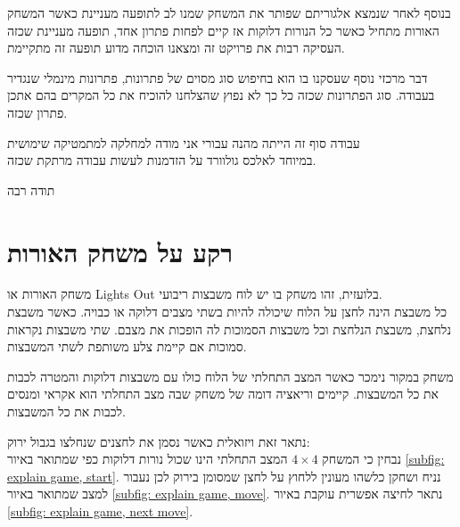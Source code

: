 \documentclass[12pt,twoside]{article}
\begin{document}
בנוסף 
לאחר שנמצא אלגוריתם שפותר את המשחק שמנו לב לתופעה מעניינת  כאשר המשחק האורות
מתחיל כאשר כל הנורות דלוקות אז קיים לפחות פתרון אחד,
תופעה מעניינת שכזה העסיקה רבות את פרויקט זה ומצאנו הוכחה מדוע תופעה זה מתקיימת.

דבר מרכזי נוסף שעסקנו בו הוא בחיפוש סוג מסוים של פתרונות, פתרונות מינמלי שנגדיר בעבודה. 
סוג הפתרונות שכזה כל כך לא נפוץ שהצלחנו להוכיח את כל המקרים 
בהם אתכן פתרון שכזה.

עבודה סוף זה הייתה מהנה עבורי אני מודה למחלקה
למתמטיקה שימושית
\\
במיוחד לאלכס גולוורד על הזדמנות לעשות 
עבודה מרתקת שכזה.

תודה רבה

\newpage

\section{רקע על משחק האורות}
משחק האורות או 
\textenglish{Lights Out}
בלועזית,
זהו משחק בו יש לוח משבצות ריבועי.
\\
כל משבצת הינה לחצן על הלוח שיכולה להיות בשתי מצבים
דלוקה או כבויה.
כאשר משבצת נלחצת, משבצת הנלחצת וכל משבצות הסמוכות לה הופכות את מצבם.
שתי משבצות נקראות סמוכות אם קיימת צלע משותפת לשתי המשבצות.

משחק במקור נימכר כאשר המצב התחלתי של הלוח כולו עם משבצות דלוקות והמטרה לכבות את כל המשבצות.
קיימים וריאציה דומה של משחק שבה מצב התחלתי הוא אקראי ומנסים לכבות את כל המשבצות.

נתאר זאת ויזואלית כאשר
נסמן את לחצנים שנחלצו בגבול ירוק:
\\
נבחין כי המשחק 
$4 \times 4$
המצב התחלתי הינו שכול נורות דלוקות
כפי שמתואר באיור
\ref{subfig: explain game, start}.
נניח ושחקן כלשהו מעונין ללחוץ על לחצן שמסומן בירוק 
לכן נעבור למצב שמתואר באיור
\ref{subfig: explain game, move}.
נתאר לחיצה אפשרית עוקבת באיור 
\ref{subfig: explain game, next move}.
\end{document}
